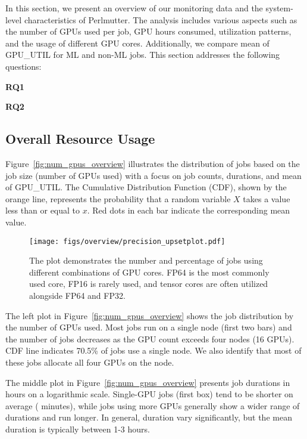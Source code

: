In this section, we present an overview of our monitoring data and the
system-level characteristics of Perlmutter.  The analysis includes various
aspects such as the number of GPUs used per job, GPU hours consumed,
utilization patterns, and the usage of different GPU cores. Additionally,
we compare mean of GPU\_UTIL for ML and non-ML jobs.
This section addresses the following questions:

\begin{RQcallout}
    {\bf RQ1 }{\it \RQone{}}
\end{RQcallout}

\begin{RQcallout}
    {\bf RQ2 }{\it \RQtwo{}}
\end{RQcallout}

\subsection{Overall Resource Usage}

Figure~\ref{fig:num_gpus_overview} illustrates the distribution of jobs based
on the job size (number of GPUs used) with a focus on job counts, durations,
and mean of GPU\_UTIL. The Cumulative Distribution Function (CDF), shown by the
orange line, represents the probability that a random variable $X$ takes a value
less than or equal to $x$. Red dots in each bar indicate the corresponding mean
value.

\begin{figure*}[t]
    \centering
    \texttt{[image: figs/overview/precision\_upsetplot.pdf]}
    \caption{The plot demonstrates the number and percentage of jobs using
        different combinations of GPU cores. FP64 is the most commonly used core,
        FP16 is rarely used, and tensor cores are often utilized alongside FP64 and
        FP32.}
    \label{fig:precision_upsetplot}
\end{figure*}

The left plot in Figure~\ref{fig:num_gpus_overview} shows the job distribution by the
number of GPUs used. Most
jobs run on a single node (first two bars) and the number of jobs decreases as the
GPU count exceeds four nodes (16 GPUs). CDF line indicates 70.5\% of jobs use
a single node. We also identify that most of these jobs allocate all four
GPUs on the node.

The middle plot in Figure~\ref{fig:num_gpus_overview} presents job durations in
hours on a logarithmic scale. Single-GPU jobs (first box) tend to be shorter on
average ( minutes), while jobs using more GPUs generally show a wider
range of durations and run longer. In general, duration vary significantly, but the
mean duration is typically between 1-3 hours.

